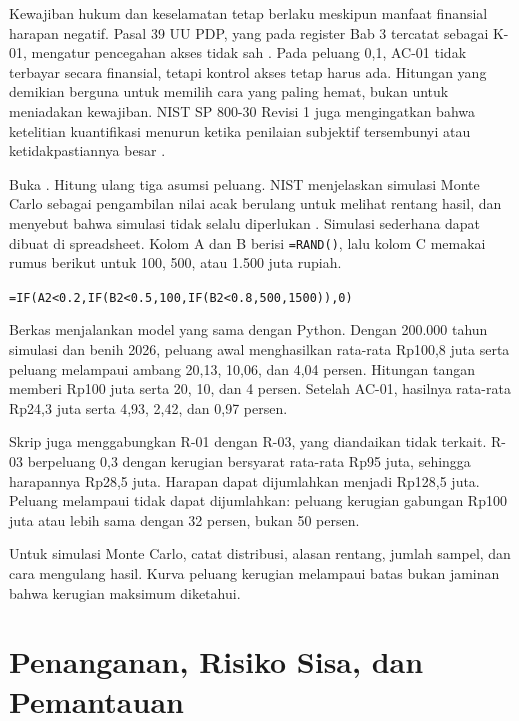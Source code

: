 Kewajiban hukum dan keselamatan tetap berlaku meskipun manfaat finansial harapan negatif. Pasal 39 UU
PDP, yang pada register Bab 3 tercatat sebagai K-01, mengatur pencegahan akses tidak sah
\cite{uu27-2022-pdp}. Pada peluang 0,1, AC-01 tidak terbayar secara finansial, tetapi kontrol akses
tetap harus ada. Hitungan yang demikian berguna untuk memilih cara yang paling hemat, bukan untuk
meniadakan kewajiban. NIST SP 800-30 Revisi 1 juga mengingatkan bahwa ketelitian kuantifikasi menurun
ketika penilaian subjektif tersembunyi atau ketidakpastiannya besar \cite{c05-nist-sp80030r1}.

\begin{pendalaman}
Buka . Hitung ulang tiga asumsi peluang. NIST
menjelaskan simulasi Monte Carlo sebagai pengambilan nilai acak berulang untuk melihat rentang hasil,
dan menyebut bahwa simulasi tidak selalu diperlukan \cite{c05-nist-ir8286ar1}. Simulasi sederhana
dapat dibuat di spreadsheet. Kolom A dan
B berisi \texttt{=RAND()}, lalu kolom C memakai rumus berikut untuk 100, 500, atau 1.500 juta rupiah.

\begin{center}
  \small\texttt{=IF(A2<0.2,IF(B2<0.5,100,IF(B2<0.8,500,1500)),0)}
\end{center}

Berkas  menjalankan model yang sama dengan Python.
Dengan 200.000 tahun simulasi dan benih 2026, peluang awal menghasilkan rata-rata Rp100,8 juta serta
peluang melampaui ambang 20,13, 10,06, dan 4,04 persen. Hitungan tangan memberi Rp100 juta serta 20,
10, dan 4 persen. Setelah AC-01, hasilnya rata-rata Rp24,3 juta serta 4,93, 2,42, dan 0,97 persen.

Skrip juga menggabungkan R-01 dengan R-03, yang diandaikan tidak terkait. R-03 berpeluang 0,3 dengan
kerugian bersyarat rata-rata Rp95 juta, sehingga harapannya Rp28,5 juta. Harapan dapat dijumlahkan
menjadi Rp128,5 juta. Peluang melampaui tidak dapat dijumlahkan: peluang kerugian gabungan Rp100 juta
atau lebih sama dengan 32 persen, bukan 50 persen.

Untuk simulasi Monte Carlo, catat distribusi, alasan rentang, jumlah sampel, dan cara mengulang hasil.
Kurva peluang kerugian melampaui batas bukan jaminan bahwa kerugian maksimum diketahui.
\end{pendalaman}

\section{Penanganan, Risiko Sisa, dan Pemantauan}


